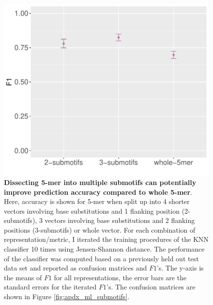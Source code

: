\begin{figure}[ht!]
    \includegraphics[scale=0.75]{graphics/f1_sce_submotif.pdf}
    \caption{\textbf{Dissecting 5-mer into multiple submotifs can potentially improve prediction accuracy compared to whole 5-mer}. Here, accuracy is shown for 5-mer when split up into 4 shorter vectors involving base substitutions and 1 flanking position (2-submotifs), 3 vectors involving base substitutions and 2 flanking positions (3-submotifs) or whole vector. For each combination of representation/metric, I iterated the training procedures of the KNN classifier 10 times using Jensen-Shannon distance. The performance of the classifier was computed based on a previously held out test data set and reported as confusion matrices and $F1$'s. The y-axis is the means of $F1$ for all representations, the error bars are the standard errors for the iterated $F1$’s. The confusion matrices are shown in Figure \ref{fig:apdx_ml_submotifs}.}
    \label{fig:f1_sce_submotif}
\end{figure}
